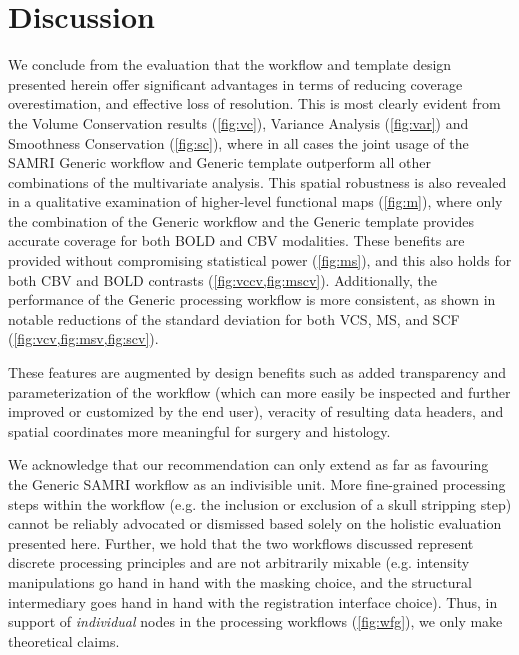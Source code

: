 \section{Discussion}

We conclude from the evaluation that the workflow and template design presented herein offer significant advantages in terms of reducing coverage overestimation, and effective loss of resolution.
This is most clearly evident from the Volume Conservation results (\cref{fig:vc}), Variance Analysis (\cref{fig:var}) and Smoothness Conservation (\cref{fig:sc}), where in all cases the joint usage of the SAMRI Generic workflow and Generic template outperform all other combinations of the multivariate analysis.
This spatial robustness is also revealed in a qualitative examination of higher-level functional maps (\cref{fig:m}), where only the combination of the Generic workflow and the Generic template provides accurate coverage for both BOLD and CBV modalities.
These benefits are provided without compromising statistical power (\cref{fig:ms}), and this also holds for both CBV and BOLD contrasts (\cref{fig:vccv,fig:mscv}).
Additionally, the performance of the Generic processing workflow is more consistent, as shown in notable reductions of the standard deviation for both VCS, MS, and SCF (\cref{fig:vcv,fig:msv,fig:scv}).

These features are augmented by design benefits such as added transparency and parameterization of the workflow (which can more easily be inspected and further improved or customized by the end user), veracity of resulting data headers, and spatial coordinates more meaningful for surgery and histology.


We acknowledge that our recommendation can only extend as far as favouring the Generic SAMRI workflow as an indivisible unit.
More fine-grained processing steps within the workflow (e.g. the inclusion or exclusion of a skull stripping step) cannot be reliably advocated or dismissed based solely on the holistic evaluation presented here.
Further, we hold that the two workflows discussed represent discrete processing principles and are not arbitrarily mixable (e.g. intensity manipulations go hand in hand with the masking choice, and the structural intermediary goes hand in hand with the registration interface choice).
Thus, in support of \textit{individual} nodes in the processing workflows (\cref{fig:wfg}), we only make theoretical claims.

